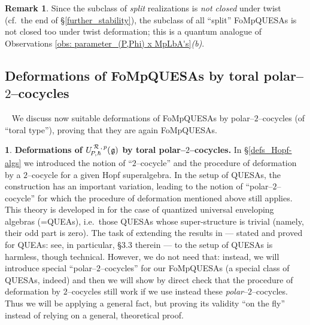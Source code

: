 \documentclass[12pt,reqno,twoside,a4paper]{amsart}
\numberwithin{equation}{section}
\theoremstyle{definition}
\newtheorem{rmk}[lema]{Remark}
\newtheorem{free text}[lema]{}
\theoremstyle{remark}
\newcommand{\R}{{\mathcal R}}
\def \lieg{\mathfrak{g}}
\def \uRpPhg{U^{\,\R\,,\,p}_{\!P,\hskip0,7pt\hbar}(\hskip0,5pt\lieg)}
\theoremstyle{plain}
\begin{document}
\vskip7pt

\begin{rmk}  \label{rmk: split FoMpQUESAs not-stable}
%
 Since the subclass of  \textsl{split\/}  realizations is  \textsl{not closed\/}  under twist
 (cf.\ the end of  \S \ref{further_stability}),
 the subclass of all ``split'' FoMpQUESAs is not closed too under twist deformation;
 this is a quantum analogue of  Observations \ref{obs: parameter_(P,Phi) x MpLbA's}\textit{(b)}.
%
\end{rmk}

\vskip15pt


\subsection{Deformations of FoMpQUESAs by toral  polar--$ 2 $--cocycles}
\label{subsec: q2cocyc-def_FoMpQUESAs}
%
 {\ }
%
 \vskip9pt
%
   We discuss now suitable deformations of FoMpQUESAs by
   polar--$ 2 $--cocycles (of ``toral type''), proving that they are again FoMpQUESAs.

\vskip9pt

\begin{free text}  \label{q2cocyc-deform_uPhgd}
%
 {\bf Deformations of  $ \uRpPhg $  by toral  polar--$ 2 $--cocycles.}
%
 In  \S \ref{defs_Hopf-algs}  we introduced the notion of ``$ 2 $--cocycle''
 and the procedure of deformation by a  $ 2 $--cocycle  for a given Hopf superalgebra.
 In the setup of QUESAs, the construction has an important variation,
 leading to the notion of  ``polar--$ 2 $--cocycle''
 for which the procedure of deformation mentioned above still applies.
 This theory is developed in  \cite{GG4}  for the case of quantized universal enveloping algebras (=QUEAs),
 i.e.\ those QUESAs whose super-structure is trivial (namely, their odd part is zero).
 The task of extending the results in  \cite{GG4}
 --- stated and proved for QUEAs: see, in particular,  \S 3.3 therein ---
 to the setup of QUESAs is harmless, though technical.
 However, we do not need that: instead, we will introduce special
 ``polar--$ 2 $--cocycles''  for our FoMpQUESAs (a special class of QUESAs, indeed)
 and then we will show by direct check that the procedure of deformation by
 $ 2 $--cocycles  still work if we use instead these  \textsl{polar}--$ 2 $--cocycles.
 Thus we will be applying a general fact, but proving its validity ``on the fly''
 instead of relying on a general, theoretical proof.
%
\end{free text}

\vskip9pt
\end{document}

